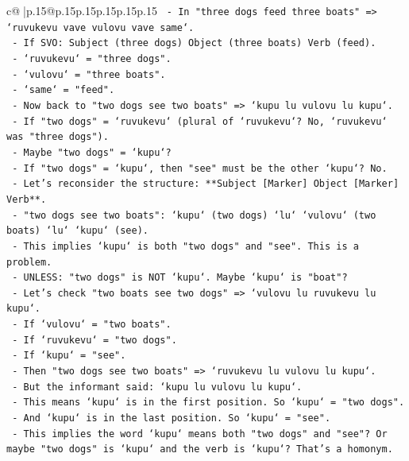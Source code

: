 \documentclass{article}
\begin{document}
{\begin{supertabular}{c@{$\;$}|p{.15\linewidth}@{}p{.15\linewidth}p{.15\linewidth}p{.15\linewidth}p{.15\linewidth}p{.15\linewidth}}
{{{\texttt{       {-} In "three dogs feed three boats" => `ruvukevu vave vulovu vave same`.} \\
\texttt{         {-} If SVO: Subject (three dogs) Object (three boats) Verb (feed).} \\
\texttt{         {-} `ruvukevu` = "three dogs".} \\
\texttt{         {-} `vulovu` = "three boats".} \\
\texttt{         {-} `same` = "feed".} \\
\texttt{       {-} Now back to "two dogs see two boats" => `kupu lu vulovu lu kupu`.} \\
\texttt{         {-} If "two dogs" = `ruvukevu` (plural of `ruvukevu`? No, `ruvukevu` was "three dogs").} \\
\texttt{         {-} Maybe "two dogs" = `kupu`?} \\
\texttt{         {-} If "two dogs" = `kupu`, then "see" must be the other `kupu`? No.} \\
\texttt{         {-} Let's reconsider the structure: **Subject {[}Marker{]} Object {[}Marker{]} Verb**.} \\
\texttt{         {-} "two dogs see two boats": `kupu` (two dogs) `lu` `vulovu` (two boats) `lu` `kupu` (see).} \\
\texttt{         {-} This implies `kupu` is both "two dogs" and "see". This is a problem.} \\
\texttt{         {-} UNLESS: "two dogs" is NOT `kupu`. Maybe `kupu` is "boat"?} \\
\texttt{         {-} Let's check "two boats see two dogs" => `vulovu lu ruvukevu lu kupu`.} \\
\texttt{           {-} If `vulovu` = "two boats".} \\
\texttt{           {-} If `ruvukevu` = "two dogs".} \\
\texttt{           {-} If `kupu` = "see".} \\
\texttt{           {-} Then "two dogs see two boats" => `ruvukevu lu vulovu lu kupu`.} \\
\texttt{           {-} But the informant said: `kupu lu vulovu lu kupu`.} \\
\texttt{           {-} This means `kupu` is in the first position. So `kupu` = "two dogs".} \\
\texttt{           {-} And `kupu` is in the last position. So `kupu` = "see".} \\
\texttt{           {-} This implies the word `kupu` means both "two dogs" and "see"? Or maybe "two dogs" is `kupu` and the verb is `kupu`? That's a homonym.} \\
}}}
\end{supertabular}}
\end{document}
